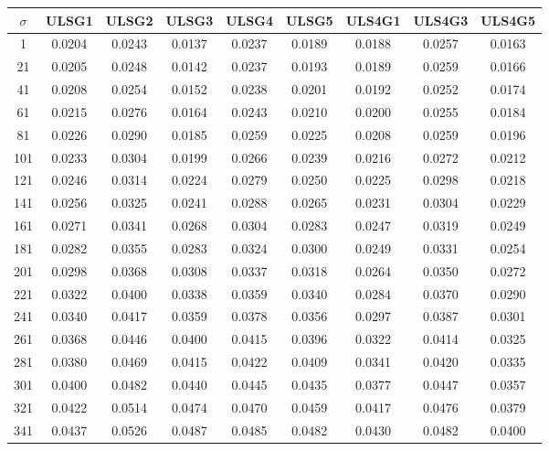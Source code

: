 \begin{table}[ht!]
\centering
\begin{tabular}{c|c|c|c|c|c|c|c|c}
$\sigma$ & \scriptsize{ULSG1} & \scriptsize{ULSG2} & \scriptsize{ULSG3} & \scriptsize{ULSG4} & \scriptsize{ULSG5} & \scriptsize{ULS4G1} & \scriptsize{ULS4G3} & \scriptsize{ULS4G5}\\ \hline 
1 & 0.0204 & 0.0243 & 0.0137 & 0.0237 & 0.0189 & 0.0188 & 0.0257 & 0.0163 \\ \hline
21 & 0.0205 & 0.0248 & 0.0142 & 0.0237 & 0.0193 & 0.0189 & 0.0259 & 0.0166 \\ \hline
41 & 0.0208 & 0.0254 & 0.0152 & 0.0238 & 0.0201 & 0.0192 & 0.0252 & 0.0174 \\ \hline
61 & 0.0215 & 0.0276 & 0.0164 & 0.0243 & 0.0210 & 0.0200 & 0.0255 & 0.0184 \\ \hline
81 & 0.0226 & 0.0290 & 0.0185 & 0.0259 & 0.0225 & 0.0208 & 0.0259 & 0.0196 \\ \hline
101 & 0.0233 & 0.0304 & 0.0199 & 0.0266 & 0.0239 & 0.0216 & 0.0272 & 0.0212 \\ \hline
121 & 0.0246 & 0.0314 & 0.0224 & 0.0279 & 0.0250 & 0.0225 & 0.0298 & 0.0218 \\ \hline
141 & 0.0256 & 0.0325 & 0.0241 & 0.0288 & 0.0265 & 0.0231 & 0.0304 & 0.0229 \\ \hline
161 & 0.0271 & 0.0341 & 0.0268 & 0.0304 & 0.0283 & 0.0247 & 0.0319 & 0.0249 \\ \hline
181 & 0.0282 & 0.0355 & 0.0283 & 0.0324 & 0.0300 & 0.0249 & 0.0331 & 0.0254 \\ \hline
201 & 0.0298 & 0.0368 & 0.0308 & 0.0337 & 0.0318 & 0.0264 & 0.0350 & 0.0272 \\ \hline
221 & 0.0322 & 0.0400 & 0.0338 & 0.0359 & 0.0340 & 0.0284 & 0.0370 & 0.0290 \\ \hline
241 & 0.0340 & 0.0417 & 0.0359 & 0.0378 & 0.0356 & 0.0297 & 0.0387 & 0.0301 \\ \hline
261 & 0.0368 & 0.0446 & 0.0400 & 0.0415 & 0.0396 & 0.0322 & 0.0414 & 0.0325 \\ \hline
281 & 0.0380 & 0.0469 & 0.0415 & 0.0422 & 0.0409 & 0.0341 & 0.0420 & 0.0335 \\ \hline
301 & 0.0400 & 0.0482 & 0.0440 & 0.0445 & 0.0435 & 0.0377 & 0.0447 & 0.0357 \\ \hline
321 & 0.0422 & 0.0514 & 0.0474 & 0.0470 & 0.0459 & 0.0417 & 0.0476 & 0.0379 \\ \hline
341 & 0.0437 & 0.0526 & 0.0487 & 0.0485 & 0.0482 & 0.0430 & 0.0482 & 0.0400 \\ \hline

\end{tabular}
\end{table}
